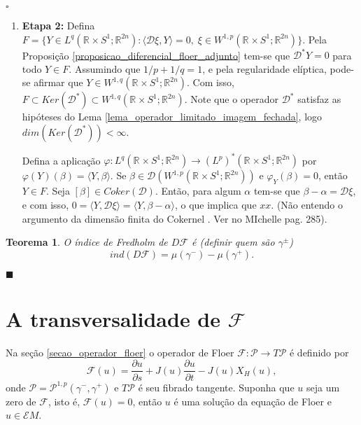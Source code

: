 \documentclass[12pt]{book}
\newtheorem{teorema}{Teorema}[section]
\newenvironment{prova}[1]{$\square$ #1}{\hfill$\blacksquare$}
\newcommand{\caminhosexponenciaisconectantesabrev}{\mathcal{P}}
\newcommand{\caminhosexponenciaisconectantes}[2]{\mathcal{P}^{1,p}(#1, #2)}
\newcommand{\caminhosexponenciaisconectantespadrao}{\caminhosexponenciaisconectantes{\gamma^{-}}{\gamma^{+}}}
\newcommand{\circulo}{S^{1}}
\newcommand{\classe}[1]{[#1]}
\newcommand{\diferencialfloer}{D\operadorFloer}
\newcommand{\diferencialfloerabrev}{\mathcal{D}}
\newcommand{\derivadaparcial}[2]{\frac{\partial #1}{\partial #2}}
\newcommand{\energiafinitaM}{\mathcal{E}M}
\newcommand{\espacoLpadjuntoretacirculo}{L^{q}(\retacartesianocirculo;\real{2n})}
\newcommand{\espacoLpdual}{(L^{p})^{*}(\retacartesianocirculo;\real{2n})}
\newcommand{\espacosobolevcontradominio}[2]{W^{1,p}(#1;#2)}
\newcommand{\espacosobolevadjuntoretacirculo}{W^{1,q}(\retacartesianocirculo;\real{2n})}
\newcommand{\espacosobolevretacirculo}{\espacosobolevcontradominio{\retacartesianocirculo}{\real{2n}}}
\newcommand{\operadorFloer}{\mathcal{F}}
\newcommand{\operadorFloerDefinicao}[1]{\derivadaparcial{#1}{s} + J(#1)\derivadaparcial{#1}{t} - J(#1)X_{H}(#1)}
\newcommand{\operadorFloerParametro}[1]{\mathcal{F}(#1)}
\newcommand{\produtointerno}[2]{\langle #1, #2 \rangle}
\newcommand{\retacartesianocirculo}{\real{} \times \circulo}
\newcommand{\real}[1]{\mathbb{R}^{#1}}
\newcommand{\vermelho}[1]{{\color{red}#1}}
\begin{document}
\begin{prova}
\begin{enumerate}
			\item \textbf{Etapa 2:} Defina 
			$
			F = \{ Y \in \espacoLpadjuntoretacirculo: \produtointerno{\diferencialfloerabrev\xi}{Y}=0,\; \xi \in \espacosobolevretacirculo\}.
			$ Pela Proposição \ref{proposicao_diferencial_floer_adjunto}  tem-se que $\diferencialfloerabrev^{*}Y=0$ para todo $Y \in F$. Assumindo que $1/p+1/q=1$, e pela regularidade elíptica, pode-se afirmar que $Y \in \espacosobolevadjuntoretacirculo$. Com isso, $F\subset Ker(\diferencialfloerabrev^{*}) \subset \espacosobolevadjuntoretacirculo$. Note que o operador $\diferencialfloerabrev^{*}$ satisfaz as hipóteses do Lema \ref{lema_operador_limitado_imagem_fechada}, logo $dim(Ker(\diferencialfloerabrev^{*}))<\infty$.
			
			Defina a aplicação $\varphi:\espacoLpadjuntoretacirculo \to \espacoLpdual$ por $\varphi(Y)(\beta)=\produtointerno{Y}{\beta}$. Se $\beta \in \diferencialfloerabrev(\espacosobolevretacirculo)$ e $\varphi_{Y}(\beta) = 0$, então $Y \in F$. Seja $\classe{\beta} \in Coker(\diferencialfloerabrev)$. Então, para algum $\alpha$ tem-se que $\beta-\alpha=\diferencialfloerabrev\xi$, e com isso, $0= \produtointerno{Y}{\diferencialfloerabrev\xi}=\produtointerno{Y}{\beta-\alpha}$, o que implica que $xx$. \vermelho{(Não entendo o argumento da dimensão finita do Cokernel . Ver no MIchelle pag. 285).}
		\end{enumerate}
		
		\begin{teorema}
			O índice de Fredholm de $\diferencialfloer$ é \vermelho{(definir quem são $\gamma^{\pm}$)}
			$$
			ind(\diferencialfloer) = \mu(\gamma^{-}) - \mu(\gamma^{+}).
			$$
		\end{teorema}
	
	\end{prova}
	
	\section{A transversalidade de $\operadorFloer$}
	Na seção \ref{secao_operador_floer} o operador de Floer $\operadorFloer: \caminhosexponenciaisconectantesabrev \to T\caminhosexponenciaisconectantesabrev$  é definido por
	$$
	\operadorFloerParametro{u} =\operadorFloerDefinicao{u},
	$$
	onde $\caminhosexponenciaisconectantesabrev = \caminhosexponenciaisconectantespadrao$ e $T\caminhosexponenciaisconectantesabrev$ é seu fibrado tangente. Suponha que $u$ seja um zero de $\operadorFloer$, isto é, $\operadorFloer(u) = 0$, então $u$ é uma solução da equação de Floer e $u \in \energiafinitaM$.
	
\end{document}
